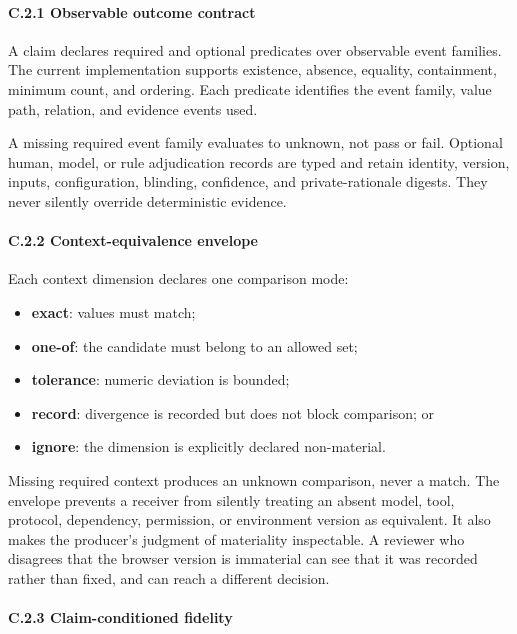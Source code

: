 \documentclass[
  american,
  10pt,
  a4paper,
]{article}
\providecommand{\tightlist}{%
  \setlength{\itemsep}{0pt}\setlength{\parskip}{0pt}}
\begin{document}
\paragraph{C.2.1 Observable outcome
contract}\label{c.2.1-observable-outcome-contract}

A claim declares required and optional predicates over observable event
families. The current implementation supports existence, absence,
equality, containment, minimum count, and ordering. Each predicate
identifies the event family, value path, relation, and evidence events
used.

A missing required event family evaluates to unknown, not pass or fail.
Optional human, model, or rule adjudication records are typed and retain
identity, version, inputs, configuration, blinding, confidence, and
private-rationale digests. They never silently override deterministic
evidence.

\paragraph{C.2.2 Context-equivalence
envelope}\label{c.2.2-context-equivalence-envelope}

Each context dimension declares one comparison mode:

\begin{itemize}
\tightlist
\item
  \textbf{exact}: values must match;
\item
  \textbf{one-of}: the candidate must belong to an allowed set;
\item
  \textbf{tolerance}: numeric deviation is bounded;
\item
  \textbf{record}: divergence is recorded but does not block comparison;
  or
\item
  \textbf{ignore}: the dimension is explicitly declared non-material.
\end{itemize}

Missing required context produces an unknown comparison, never a match.
The envelope prevents a receiver from silently treating an absent model,
tool, protocol, dependency, permission, or environment version as
equivalent. It also makes the producer's judgment of materiality
inspectable. A reviewer who disagrees that the browser version is
immaterial can see that it was recorded rather than fixed, and can reach
a different decision.

\paragraph{C.2.3 Claim-conditioned
fidelity}\label{c.2.3-claim-conditioned-fidelity}
\end{document}
